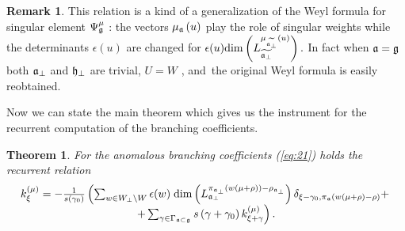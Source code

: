 \documentclass[12pt]{iopart}
\newtheorem{theorem}{Theorem}
\theoremstyle{definition}
\newtheorem{remark}{Remark}
\begin{document}
\begin{remark}
This relation is a kind of a generalization of the Weyl formula for singular
element $\Psi _{\frak{g}}^{\mu }$ : the vectors $\mu _{\frak{a}}\left(
u\right) $ play the role of singular weights while the determinants $%
\epsilon (u)$ are changed for $\epsilon (u)\mathrm{\dim }\left( L_{%
\widetilde{\frak{a}_{\perp }}}^{\mu _{\widetilde{\frak{a}_{\perp }}}\left(
u\right) }\right) .$ In fact when $\frak{a=g}$ both $\frak{a}_{\perp }$ and $%
\frak{h}_{\perp }$ are trivial, $U=W$ , and\ the original Weyl formula is
easily reobtained.
\end{remark}
Now we can state the main theorem which gives us the instrument for the
recurrent computation of the branching coefficients.
\begin{theorem}
  For the anomalous branching coefficients (\ref{eq:21}) holds the recurrent relation
  \begin{equation}
    \label{eq:1}
    \label{recurrent-relation}
    \begin{array}{c}
      k_{\xi }^{\left( \mu \right) }=-\frac{1}{s\left( \gamma _{0}\right) }\left(
        \sum_{w\in W_{\bot}\backslash W} \epsilon(w)\;
        {\rm dim}\left(L^{\pi_{\mathfrak{a}_{\bot}}(w(\mu+\rho))-\rho_{\mathfrak{a}_{\bot}}}_{\mathfrak{a}_{\bot}}\right)
        \delta_{\xi-\gamma_0,\pi_{\mathfrak{a}}(w(\mu+\rho)-\rho)}+ \right.\\
      \left.
        +\sum_{\gamma \in
          \Gamma _{\frak{a}\subset \frak{g}}}s\left( \gamma +\gamma _{0}\right) k_{\xi
          +\gamma }^{\left( \mu \right) }\right).
    \end{array}
  \end{equation}


\end{theorem}
\end{document}
